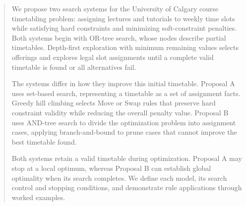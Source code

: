 \begin{abstract}
We propose two search systems for the University of Calgary course timetabling problem: assigning lectures and tutorials to weekly time slots while satisfying hard constraints and minimizing soft-constraint penalties. Both systems begin with OR-tree search, whose nodes describe partial timetables. Depth-first exploration with minimum remaining values selects offerings and explores legal slot assignments until a complete valid timetable is found or all alternatives fail.

The systems differ in how they improve this initial timetable. Proposal A uses set-based search, representing a timetable as a set of assignment facts. Greedy hill climbing selects Move or Swap rules that preserve hard constraint validity while reducing the overall penalty value. Proposal B uses AND-tree search to divide the optimization problem into assignment cases, applying branch-and-bound to prune cases that cannot improve the best timetable found.

Both systems retain a valid timetable during optimization. Proposal A may stop at a local optimum, whereas Proposal B can establish global optimality when its search completes. We define each model, its search control and stopping conditions, and demonstrate rule applications through worked examples.
\end{abstract}